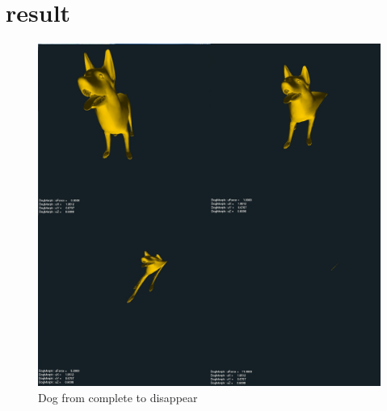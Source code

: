 \documentclass[12pt,letterpaper]{article}
\begin{document}
\section{result}

\begin{figure}[p]
    \centering
    \includegraphics[width=1.0\textwidth]{all4.jpg}
    \caption{Dog from complete to disappear}
\end{figure}
\end{document}

